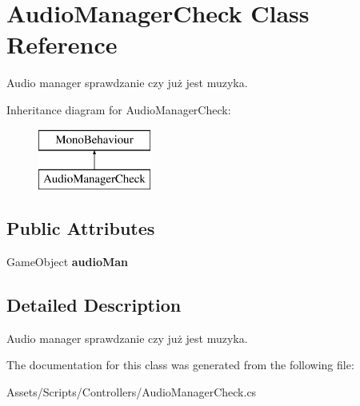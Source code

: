\hypertarget{class_audio_manager_check}{}\section{Audio\+Manager\+Check Class Reference}
\label{class_audio_manager_check}


Audio manager sprawdzanie czy już jest muzyka.  


Inheritance diagram for Audio\+Manager\+Check\+:\begin{figure}[H]
\begin{center}
\leavevmode
\includegraphics[height=2.000000cm]{class_audio_manager_check}
\end{center}
\end{figure}
\subsection*{Public Attributes}
\begin{DoxyCompactItemize}
\item 
\mbox{\label{class_audio_manager_check_a7aa8709977e3b722d82f0ea416b6a305}} 
Game\+Object {\bfseries audio\+Man}
\end{DoxyCompactItemize}


\subsection{Detailed Description}
Audio manager sprawdzanie czy już jest muzyka. 



The documentation for this class was generated from the following file\+:\begin{DoxyCompactItemize}
\item 
Assets/\+Scripts/\+Controllers/Audio\+Manager\+Check.\+cs\end{DoxyCompactItemize}
